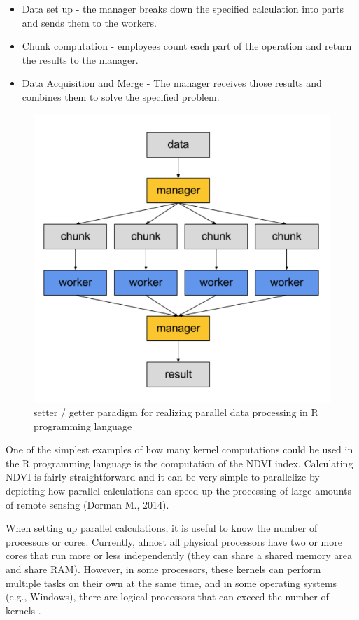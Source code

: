 {{{	\begin{itemize}
		\item Data set up - the manager breaks down the specified calculation into parts and sends them to the workers.
		\item Chunk computation - employees count each part of the operation and return the results to the manager.
		\item Data Acquisition and Merge - The manager receives those results and combines them to solve the specified problem.
	\end{itemize}

	\begin{figure}[H]
		\centering
		\includegraphics[width=0.9\linewidth]{images/parallel_execution_model.png}
		\caption{setter / getter paradigm for realizing parallel data processing in R programming language}
		\label{fig:par_exec_model}
	\end{figure}

	One of the simplest examples of how many kernel computations could be used in the R programming language is the computation of the NDVI index. Calculating NDVI is fairly straightforward and it can be very simple to parallelize by depicting how parallel calculations can speed up the processing of large amounts of remote sensing (Dorman M., 2014).
	
	When setting up parallel calculations, it is useful to know the number of processors or cores. Currently, almost all physical processors have two or more cores that run more or less independently (they can share a shared memory area and share RAM). However, in some processors, these kernels can perform multiple tasks on their own at the same time, and in some operating systems (e.g., Windows), there are logical processors that can exceed the number of kernels \cite{Matloff2015}.
	
}}}
